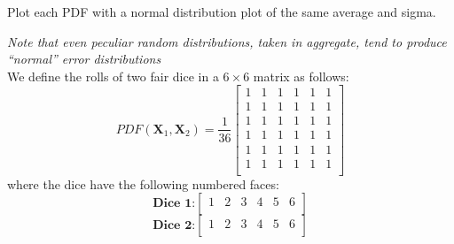 \documentclass[12pt,letterpaper, onecolumn]{exam}
\begin{document}
\begin{questions}
	Plot each PDF with a normal distribution plot of the same average and sigma.

	\textit{Note that even peculiar random distributions, taken in aggregate, tend to produce
		“normal” error distributions}
	\clearpage
	\\
	\solution
	We define the rolls of two fair dice in a $6 \times 6$ matrix as follows:
	\begin{equation}
		PDF(\mathbf{X}_1, \mathbf{X}_2) =
		\frac{1}{36}
		\begin{bmatrix}
			1 & 1 & 1 & 1 & 1 & 1 \\
			1 & 1 & 1 & 1 & 1 & 1 \\
			1 & 1 & 1 & 1 & 1 & 1 \\
			1 & 1 & 1 & 1 & 1 & 1 \\
			1 & 1 & 1 & 1 & 1 & 1 \\
			1 & 1 & 1 & 1 & 1 & 1 \\
		\end{bmatrix}
	\end{equation}
	where the dice have the following numbered faces:
	\[\textbf{Dice 1:}
		\begin{bmatrix}
			1 & 2 & 3 & 4 & 5 & 6 \\
		\end{bmatrix} \]
	\[\textbf{Dice 2:}
		\begin{bmatrix}
			1 & 2 & 3 & 4 & 5 & 6 \\
		\end{bmatrix} \]
	\begin{parts}

\end{parts}
\end{questions}
\end{document}
